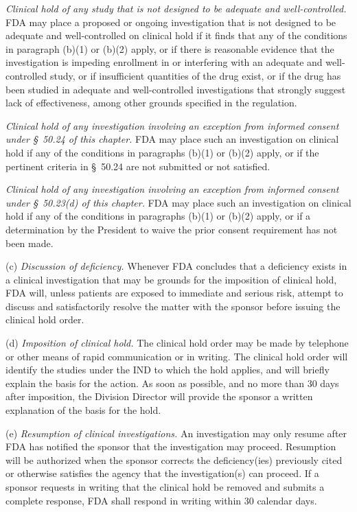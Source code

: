 \documentclass[11pt]{article}
\begin{document}
\begin{description}[leftmargin=0.5cm,style=sameline]
\item[(4)] \textit{Clinical hold of any study that is not designed to be adequate and well-controlled.} FDA may place a proposed or ongoing investigation that is not designed to be adequate and well-controlled on clinical hold if it finds that any of the conditions in paragraph (b)(1) or (b)(2) apply, or if there is reasonable evidence that the investigation is impeding enrollment in or interfering with an adequate and well-controlled study, or if insufficient quantities of the drug exist, or if the drug has been studied in adequate and well-controlled investigations that strongly suggest lack of effectiveness, among other grounds specified in the regulation.

\item[(5)] \textit{Clinical hold of any investigation involving an exception from informed consent under \S~50.24 of this chapter.} FDA may place such an investigation on clinical hold if any of the conditions in paragraphs (b)(1) or (b)(2) apply, or if the pertinent criteria in \S~50.24 are not submitted or not satisfied.

\item[(6)] \textit{Clinical hold of any investigation involving an exception from informed consent under \S~50.23(d) of this chapter.} FDA may place such an investigation on clinical hold if any of the conditions in paragraphs (b)(1) or (b)(2) apply, or if a determination by the President to waive the prior consent requirement has not been made.
\end{description}

(c) \textit{Discussion of deficiency.} Whenever FDA concludes that a deficiency exists in a clinical investigation that may be grounds for the imposition of clinical hold, FDA will, unless patients are exposed to immediate and serious risk, attempt to discuss and satisfactorily resolve the matter with the sponsor before issuing the clinical hold order.

(d) \textit{Imposition of clinical hold.} The clinical hold order may be made by telephone or other means of rapid communication or in writing. The clinical hold order will identify the studies under the IND to which the hold applies, and will briefly explain the basis for the action. As soon as possible, and no more than 30 days after imposition, the Division Director will provide the sponsor a written explanation of the basis for the hold.

(e) \textit{Resumption of clinical investigations.} An investigation may only resume after FDA has notified the sponsor that the investigation may proceed. Resumption will be authorized when the sponsor corrects the deficiency(ies) previously cited or otherwise satisfies the agency that the investigation(s) can proceed. If a sponsor requests in writing that the clinical hold be removed and submits a complete response, FDA shall respond in writing within 30 calendar days.
\end{document}
